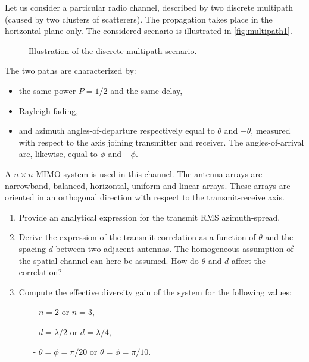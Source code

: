 \documentclass [a4paper, 11pt] {article}
\begin{document}
    \begin{exercise}{1}

        Let us consider a particular radio channel, described by two discrete multipath (caused by two clusters of scatterers). The propagation takes place in the horizontal plane only. The considered scenario is illustrated in \autoref{fig:multipath1}.

        \begin{figure}[H]
        \centering
        
        \caption{Illustration of the discrete multipath scenario.}
        \label{fig:multipath1}
        \end{figure}

    The two paths are characterized by:
    \begin{itemize}
        \item the same power $P=1/2$  and the same delay,
        \item Rayleigh fading,
        \item and azimuth angles-of-departure respectively equal to $\theta$ and $-\theta$, measured with respect to the axis joining transmitter and receiver. The angles-of-arrival are, likewise, equal to $\phi$ and $-\phi$.
    \end{itemize}
    \noindent
    A $n \times n$ MIMO system is used in this channel. The antenna arrays are narrowband, balanced, horizontal, uniform and linear arrays. These arrays are oriented in an orthogonal direction with respect to the transmit-receive axis.
    \begin{enumerate}
        \item Provide an analytical expression for the transmit RMS azimuth-spread.
        \item Derive the expression of the transmit correlation as a function of $\theta$ and the spacing $d$ between two adjacent antennas. The homogeneous assumption of the spatial channel can here be assumed. How do $\theta$ and $d$ affect the correlation?
        \item Compute the effective diversity gain of the system for the following values:
        \begin{itemize}
            \item[-] $n=2$ or $n=3$,
            \item[-] $d = \lambda / 2$ or $d = \lambda / 4$,
            \item[-] $\theta = \phi = \pi/20$ or $\theta = \phi = \pi/10$.
        \end{itemize}
    \end{enumerate}

    \end{exercise}
\end{document}
